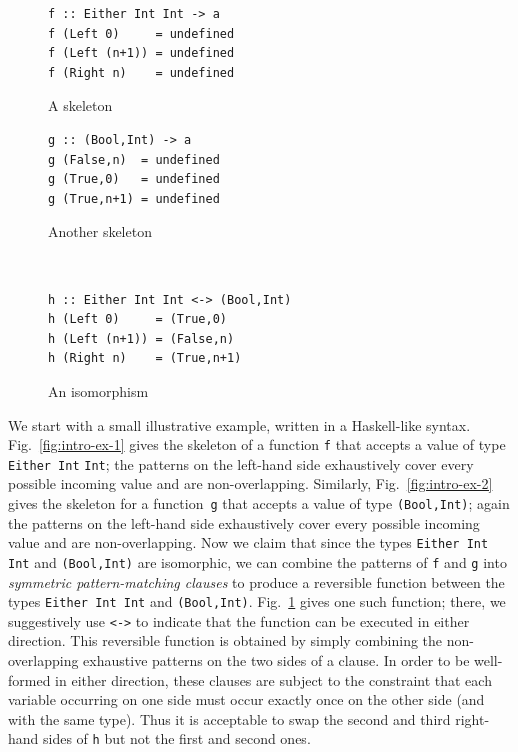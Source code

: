 \documentclass{article}
\begin{document}
\begin{figure}[t]
  \centering
  \begin{minipage}{0.4\linewidth}
    \begin{verbatim}
f :: Either Int Int -> a
f (Left 0)     = undefined
f (Left (n+1)) = undefined
f (Right n)    = undefined
\end{verbatim}\vspace{-4ex}
    \caption{A skeleton}\label{fig:intro-ex-1}
  \end{minipage}
  \hfill
  \begin{minipage}{0.4\linewidth}
\begin{verbatim}
g :: (Bool,Int) -> a
g (False,n)  = undefined
g (True,0)   = undefined
g (True,n+1) = undefined
\end{verbatim}\vspace{-4ex}
    \caption{Another skeleton}\label{fig:intro-ex-2}
  \end{minipage}
  \\[3ex]
  \begin{minipage}{0.6\linewidth}
\begin{verbatim}
h :: Either Int Int <-> (Bool,Int)
h (Left 0)     = (True,0)
h (Left (n+1)) = (False,n)
h (Right n)    = (True,n+1)
\end{verbatim}\vspace{-4ex}
    \caption{An isomorphism}\label{fig:intro-ex-3}
  \end{minipage}
\end{figure}

We start with a small illustrative example, written in a Haskell-like
syntax.  Fig.~\ref{fig:intro-ex-1} gives the skeleton of a function
\verb|f| that accepts a value of type \verb|Either Int| \verb|Int|; the
patterns on the left-hand side exhaustively cover every possible
incoming value and are non-overlapping. Similarly,
Fig.~\ref{fig:intro-ex-2} gives the skeleton for a function~\verb|g|
that accepts a value of type \verb|(Bool,Int)|; again the patterns on
the left-hand side exhaustively cover every possible incoming value
and are non-overlapping. Now we claim that since the types
\verb|Either Int Int| and \verb|(Bool,Int)| are isomorphic, we can
combine the patterns of \verb|f| and \verb|g| into \emph{symmetric
  pattern-matching clauses} to produce a reversible function between
the types \verb|Either Int Int| and
\verb|(Bool,Int)|. Fig.~\ref{fig:intro-ex-3} gives one such function;
there, we suggestively use \verb|<->| to indicate that the function
can be executed in either direction. This reversible function is
obtained by simply combining the non-overlapping exhaustive patterns
on the two sides of a clause. In order to be well-formed in either
direction, these clauses are subject to the constraint that each
variable occurring on one side must occur exactly once on the other
side (and with the same type). Thus it is acceptable to swap the
second and third right-hand sides of \verb|h| but not the first and
second ones.
\end{document}
